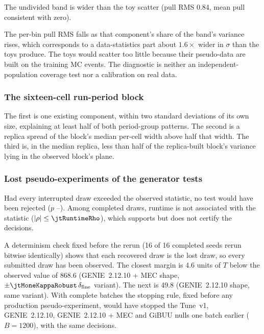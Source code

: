 The undivided band is wider than the toy scatter (pull RMS 0.84, mean pull consistent with zero).

The per-bin pull RMS falls as that component's share of the band's variance rises, which corresponds to a data-statistics part about $1.6\times$ wider in $\sigma$ than the toys produce. The toys would scatter too little because their pseudo-data are built on the training MC events. The diagnostic is neither an independent-population coverage test nor a calibration on real data.

\subsubsection{The sixteen-cell run-period block}

The first is one existing component, within two standard deviations of its own size, explaining at least half of both period-group patterns. The second is a replica spread of the block's median per-cell width above half that width. The third is, in the median replica, less than half of the replica-built block's variance lying in the observed block's plane.

\subsubsection{Lost pseudo-experiments of the generator tests}

Had every interrupted draw exceeded the observed statistic, no test would have been rejected ($p$ \jtWorstIntLo--\jtWorstIntHi). Among completed draws, runtime is not associated with the statistic ($|\rho|\le\jtRuntimeRho$), which supports but does not certify the decisions.

A determinism check fixed before the rerun (16 of 16 completed seeds rerun bitwise identically) shows that each recovered draw is the lost draw, so every submitted draw has been observed. The closest margin is 4.6 units of $T$ below the observed value of 868.6 (GENIE~2.12.10 + MEC shape, $\pm\jtMoneKappaRobust\,\delta_{\mathrm{fine}}$ variant). The next is 49.8 (GENIE~2.12.10 shape, same variant). With complete batches the stopping rule, fixed before any production pseudo-experiment, would have stopped the Tune~v1, GENIE~2.12.10, GENIE~2.12.10 + MEC and GiBUU nulls one batch earlier ($B=1200$), with the same decisions.

